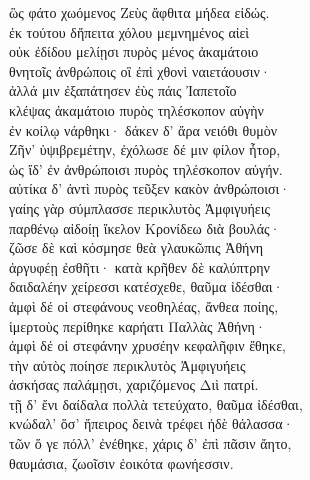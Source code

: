 \quad{}ὣς φάτο χωόμενος Ζεὺς ἄφθιτα μήδεα εἰδώς. \\
ἐκ τούτου δἤπειτα χόλου μεμνημένος αἰεὶ \\
οὐκ ἐδίδου μελίῃσι πυρὸς μένος ἀκαμάτοιο\\
θνητοῖς ἀνθρώποις οἳ ἐπὶ χθονὶ ναιετάουσιν· \\
ἀλλά μιν ἐξαπάτησεν ἐὺς πάις Ἰαπετοῖο \\
κλέψας ἀκαμάτοιο πυρὸς τηλέσκοπον αὐγὴν\\
ἐν κοίλῳ νάρθηκι· δάκεν δ' ἄρα νειόθι θυμὸν\\
Ζῆν' ὑψιβρεμέτην, ἐχόλωσε δέ μιν φίλον ἦτορ,\\
ὡς ἴδ' ἐν ἀνθρώποισι πυρὸς τηλέσκοπον αὐγήν.\\
αὐτίκα δ' ἀντὶ πυρὸς τεῦξεν κακὸν ἀνθρώποισι·  \\
γαίης γὰρ σύμπλασσε περικλυτὸς Ἀμφιγυήεις\\
παρθένῳ αἰδοίῃ ἴκελον Κρονίδεω διὰ βουλάς· \\
ζῶσε δὲ καὶ κόσμησε θεὰ γλαυκῶπις Ἀθήνη\\
ἀργυφέῃ ἐσθῆτι· κατὰ κρῆθεν δὲ καλύπτρην \\
δαιδαλέην χείρεσσι κατέσχεθε, θαῦμα ἰδέσθαι·  \\
ἀμφὶ δέ οἱ στεφάνους νεοθηλέας, ἄνθεα ποίης,\\
ἱμερτοὺς περίθηκε καρήατι Παλλὰς Ἀθήνη· \\
ἀμφὶ δέ οἱ στεφάνην χρυσέην κεφαλῆφιν ἔθηκε,\\
τὴν αὐτὸς ποίησε περικλυτὸς Ἀμφιγυήεις\\
ἀσκήσας παλάμῃσι, χαριζόμενος Διὶ πατρί. \\
τῇ δ' ἔνι δαίδαλα πολλὰ τετεύχατο, θαῦμα ἰδέσθαι,\\
κνώδαλ' ὅσ' ἤπειρος δεινὰ τρέφει ἠδὲ θάλασσα·\\
τῶν ὅ γε πόλλ' ἐνέθηκε, χάρις δ' ἐπὶ πᾶσιν ἄητο,\\
θαυμάσια, ζωοῖσιν ἐοικότα φωνήεσσιν.

